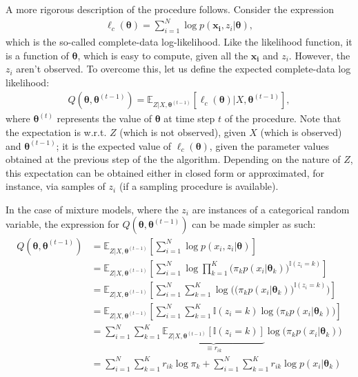 A more rigorous description of the procedure follows. Consider the expression
\begin{align}
    \ell_c(\bm{\theta}) = \sum^N_{i=1} \log p(\bm{x_i}, z_i | \bm{\theta}),
\end{align} which is the so-called complete-data log-likelihood. Like the likelihood
function, it is a function of $\bm{\theta}$, which is easy to compute, given all
the $\bm{x_i}$ and $z_i$.
However, the $z_i$ aren't observed. To overcome this, let us define the expected
complete-data log likelihood:
\begin{align}
    Q(\bm{\theta}, \bm{\theta}^{(t-1)}) = \mathbb{E}_{Z|X, \bm{\theta}^{(t-1)}}[\ell_c(\bm{\theta}) | X, \bm{\theta}^{(t-1)}],
\end{align} where $\bm{\theta}^{(t)}$ represents the value of $\bm{\theta}$ at time step
$t$ of the procedure. Note that the expectation is w.r.t. $Z$ (which is not observed),
given $X$ (which is observed)
and $\bm{\theta}^{(t-1)}$; it is the expected value of $\ell_c(\bm{\theta})$, given
the parameter values obtained at the previous step of the the algorithm. Depending
on the nature of $Z$, this expectation can be obtained either in closed form or
approximated, for instance, via samples of $z_i$ (if a sampling procedure is available).

In the case of mixture models, where the $z_i$ are instances of a categorical
random variable, the expression for $Q(\bm{\theta}, \bm{\theta}^{(t-1)})$ can be made
simpler as such:
\begin{align}
    Q(\bm{\theta}, \bm{\theta}^{(t-1)}) &= \mathbb{E}_{Z|X, \bm{\theta}^{(t-1)}}[\sum_{i=1}^N \log p(x_i, z_i | \bm{\theta})] \\
    &= \mathbb{E}_{Z|X, \bm{\theta}^{(t-1)}}[\sum_{i=1}^N \log \prod_{k=1}^K \big(\pi_k p(x_i | \bm{\theta}_k)\big)^{\mathbb{I}(z_i = k)}] \\
    &= \mathbb{E}_{Z|X, \bm{\theta}^{(t-1)}}[\sum_{i=1}^N \sum_{k=1}^K \log\Big(\big(\pi_k p(x_i | \bm{\theta}_k)\big)^{\mathbb{I}(z_i = k)}\Big)] \\
    &= \mathbb{E}_{Z|X, \bm{\theta}^{(t-1)}}[\sum_{i=1}^N \sum_{k=1}^K \mathbb{I}(z_i = k) \log\Big(\pi_k p(x_i | \bm{\theta}_k)\Big)] \\
    &= \sum_{i=1}^N \sum_{k=1}^K \underbrace{\mathbb{E}_{Z|X, \bm{\theta}^{(t-1)}}[\mathbb{I}(z_i = k)]}_{\equiv r_{ik}} \log\Big(\pi_k p(x_i | \bm{\theta}_k)\Big)\\
    &= \sum_{i=1}^N \sum_{k=1}^K r_{ik} \log\pi_k + \sum_{i=1}^N \sum_{k=1}^K r_{ik} \log p(x_i | \bm{\theta}_k) \label{eq:qthetatheta}
\end{align}


